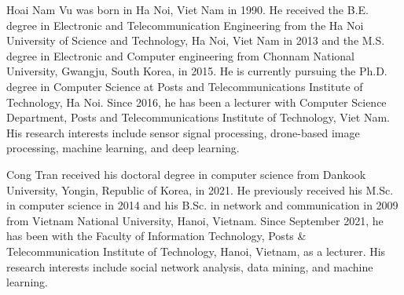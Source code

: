 \documentclass{ieeeaccess}
\begin{document}
\begin{IEEEbiography}{Hoai Nam Vu} was born in Ha Noi, Viet Nam in 
1990. He received the B.E. degree in Electronic and Telecommunication Engineering from 
the Ha Noi University of Science and Technology, Ha Noi, Viet Nam in 2013 and the M.S. degree in 
Electronic and Computer engineering from Chonnam National University, Gwangju, South Korea, in 2015. He is currently pursuing the Ph.D. degree in Computer Science at Posts and Telecommunications Institute of Technology, Ha Noi.
Since 2016, he has been a lecturer with Computer Science Department, Posts and Telecommunications Institute of Technology, Viet Nam. His research interests include sensor signal processing, drone-based image processing, machine learning, and deep learning.
\end{IEEEbiography}


\begin{IEEEbiography}{Cong Tran}  received his doctoral degree in computer science from Dankook University, Yongin,
Republic of Korea, in 2021. He previously received his M.Sc. in computer science in 2014 and his B.Sc. in network and communication in 2009 from Vietnam National University, Hanoi, Vietnam. Since September 2021, he has been with the Faculty of Information Technology, Posts \& Telecommunication Institute of Technology, Hanoi, Vietnam, as a lecturer. His research interests include social network analysis, data mining, and machine learning.
\end{IEEEbiography}
\EOD
\end{document}
